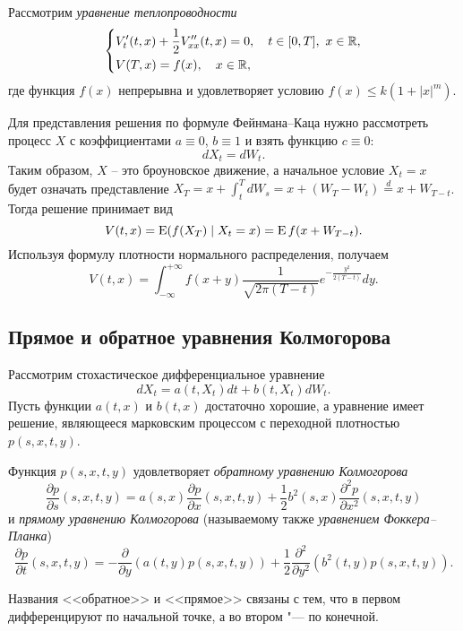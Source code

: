 \begin{example}
Рассмотрим \emph{уравнение теплопроводности}%
\[
\left\{
\begin{aligned}
&V'_t(t,x) + \frac12 V''_{xx}(t,x) = 0, \quad t\in[0,T],\ x\in\mathbb{R},\\
&V(T,x) = f(x),\quad x\in \mathbb{R},
\end{aligned}
\right.
\]
где функция $f(x)$ непрерывна и удовлетворяет условию $f(x) \le k(1+|x|^m)$.

Для представления решения по формуле Фейнмана--Каца нужно рассмотреть процесс $X$ с коэффициентами $a\equiv 0$, $b\equiv 1$ и взять функцию $c\equiv 0$:
\[
dX_t = dW_t.
\]
Таким образом, $X$ -- это броуновское движение, а начальное условие $X_t=x$ будет означать представление $X_T = x + \int_t^T d W_s = x + (W_T-W_t) \stackrel{d}{=} x + W_{T-t}$.
Тогда решение принимает вид
\[
V(t,x) = \operatorname{E}(f(X_T) \mid X_t = x) = \operatorname{E} f(x + W_{T-t}).
\]
Используя формулу плотности нормального распределения, получаем
\[
V(t,x) = \int_{-\infty}^{+\infty} f(x+y) \frac1{\sqrt{2\pi(T-t)}} e^{-\frac{y^2}{2(T-t)}} dy.
\]
\end{example}


\subsection{Прямое и обратное уравнения Колмогорова}
Рассмотрим стохастическое дифференциальное уравнение
\[
dX_t = a(t,X_t) dt + b(t,X_t) dW_t.
\]
Пусть функции $a(t,x)$ и $b(t,x)$ достаточно хорошие, а уравнение имеет решение, являющееся марковским процессом с переходной плотностью $p(s,x,t,y)$.

\begin{theorem}
Функция $p(s,x,t,y)$ удовлетворяет \emph{обратному уравнению Колмогорова} 
\begin{equation}
\label{8:backward}
\frac{\partial p}{\partial s} (s,x,t,y) = a(s,x) \frac{\partial p}{\partial x}(s,x,t,y)
+ \frac12 b^2(s,x) \frac{\partial^2 p}{\partial x^2}(s,x,t,y)
\end{equation}
и \emph{прямому уравнению Колмогорова} (называемому также \emph{уравнением Фоккера--Планка})
\begin{equation}
\label{8:forward}
\frac{\partial p}{\partial t}(s,x,t,y) = -\frac{\partial}{\partial y} (a(t,y) p(s,x,t,y))
+ \frac12 \frac{\partial^2}{\partial y^2} (b^2(t,y) p(s,x,t,y)).
\end{equation}
\end{theorem}

Названия <<обратное>> и <<прямое>> связаны с тем, что в первом дифференцируют по начальной точке, а во втором "--- по конечной.

